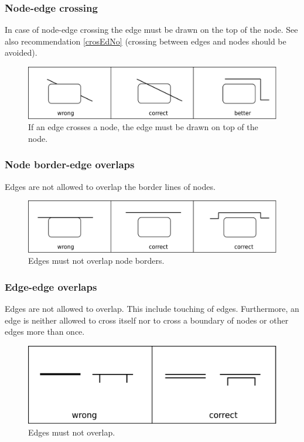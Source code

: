 \subsubsection{Node-edge crossing}\label{crosEdNoRe}

In case of node-edge crossing the edge must be drawn on the top of
the node. See also recommendation \ref{crosEdNo} (crossing between
edges and nodes should be avoided).

\begin{figure}[h!]
  \centering
  \includegraphics[scale=0.3]{images/layout-node-edge}
  \caption{If an edge crosses a node, the edge must be drawn on top
  of the node.}\label{layout2}
\end{figure}

\subsubsection{Node border-edge overlaps}

Edges are not allowed to overlap the border lines of nodes.

\begin{figure}[h!]
  \centering
  \includegraphics[scale=0.3]{images/layout-node-border-edge}
  \caption{Edges must not overlap node borders.}\label{layout3}
\end{figure}

\subsubsection{Edge-edge overlaps}

Edges are not allowed to overlap. This include touching of edges.
Furthermore, an edge is neither allowed to cross itself nor to cross
a boundary of nodes or other edges more than once.

\begin{figure}[h!]
  \centering
  \includegraphics[scale=0.3]{images/layout-edge-edge}
  \caption{Edges must not overlap.}\label{layout4}
\end{figure}

